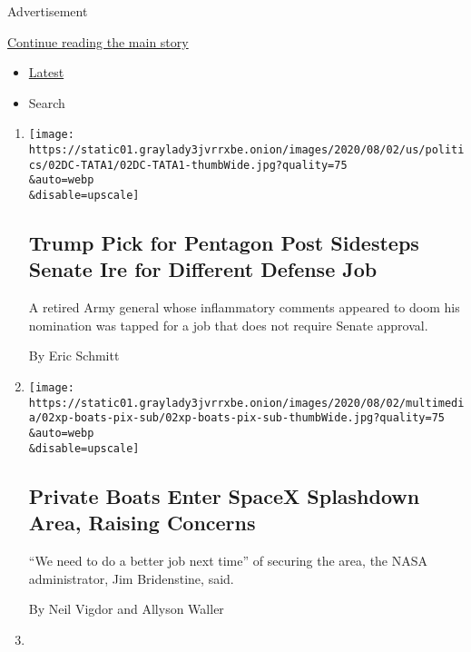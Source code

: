 Advertisement

\protect\hyperlink{after-mid1}{Continue reading the main story}

\begin{itemize}
\tightlist
\item
  \protect\hyperlink{stream-panel}{Latest}
\item
  Search
\end{itemize}

\begin{enumerate}
\def\labelenumi{\arabic{enumi}.}
\item
  \href{/2020/08/02/us/politics/anthony-tata-pentagon-nomination.html}{}

  \texttt{[image: https://static01.graylady3jvrrxbe.onion/images/2020/08/02/us/politics/02DC-TATA1/02DC-TATA1-thumbWide.jpg?quality=75\\\&auto=webp\\\&disable=upscale]}

  \hypertarget{trump-pick-for-pentagon-post-sidesteps-senate-ire-for-different-defense-job}{%
  \subsection{Trump Pick for Pentagon Post Sidesteps Senate Ire for
  Different Defense
  Job}\label{trump-pick-for-pentagon-post-sidesteps-senate-ire-for-different-defense-job}}

  A retired Army general whose inflammatory comments appeared to doom
  his nomination was tapped for a job that does not require Senate
  approval.

  By Eric Schmitt
\item
  \href{/2020/08/02/us/flag-boat-SpaceX.html}{}

  \texttt{[image: https://static01.graylady3jvrrxbe.onion/images/2020/08/02/multimedia/02xp-boats-pix-sub/02xp-boats-pix-sub-thumbWide.jpg?quality=75\\\&auto=webp\\\&disable=upscale]}

  \hypertarget{private-boats-enter-spacex-splashdown-area-raising-concerns}{%
  \subsection{Private Boats Enter SpaceX Splashdown Area, Raising
  Concerns}\label{private-boats-enter-spacex-splashdown-area-raising-concerns}}

  ``We need to do a better job next time'' of securing the area, the
  NASA administrator, Jim Bridenstine, said.

  By Neil Vigdor and Allyson Waller
\item
  \href{/2020/08/02/us/politics/coronavirus-vaccine.html}{}


\end{enumerate}
